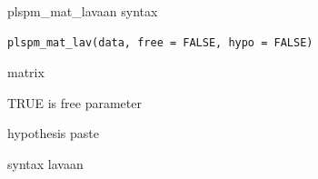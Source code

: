 \documentclass[a4paper]{book}
\begin{document}
%
\begin{Description}
plspm\_mat\_lavaan syntax
\end{Description}
%
\begin{Usage}
\begin{verbatim}
plspm_mat_lav(data, free = FALSE, hypo = FALSE)
\end{verbatim}
\end{Usage}
%
\begin{Arguments}
\begin{ldescription}
\item[\code{data}] matrix

\item[\code{free}] TRUE is free parameter

\item[\code{hypo}] hypothesis paste
\end{ldescription}
\end{Arguments}
%
\begin{Value}
syntax lavaan
\end{Value}
%
\end{document}
